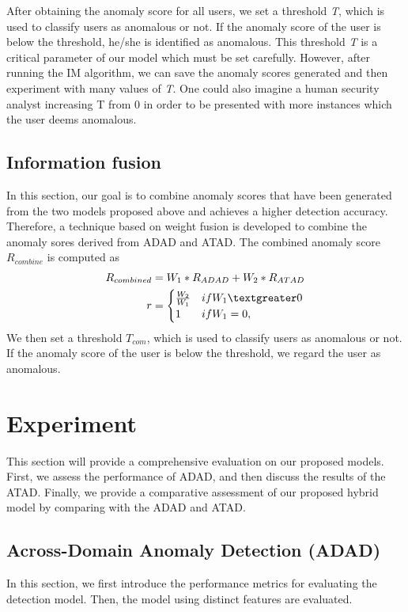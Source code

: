 \documentclass[conference]{IEEEtran}
\begin{document}
After obtaining the anomaly score for all users, 
we set a threshold \emph{T}, which is used to classify users as anomalous or not. If the anomaly score of the user is below the threshold, he/she is identified as anomalous. This threshold \emph{T} is a critical parameter of our model which must be set carefully.
However, after running the IM algorithm, we can save the anomaly scores generated and then experiment with many values of \emph{T}. One could also imagine a human security analyst increasing T from 0 in order to be presented with more instances which the user deems anomalous.
\subsection{Information fusion}
In this section, our goal is to combine anomaly scores that have been generated from the two models proposed above and achieves a higher detection accuracy.
Therefore, a technique based on weight fusion is developed to combine the anomaly sores derived  from ADAD and ATAD. The combined anomaly score \emph{$R_{combine}$} is computed as
\begin{align}
R_{combined}&= W_1*R_{ADAD}+W_2*R_{ATAD}\\
r&=\begin{cases}
\frac{W_2}{W_1}
&\mbox{if } W_1 \textgreater 0\\
1
&\mbox{if } W_1 = 0,\\
\end{cases}
\end{align}
We then set a threshold \emph{$T_{com}$}, which is used to classify users as anomalous or not. If the anomaly score of the user is below the threshold, we regard the user as anomalous.

\section{Experiment}

This section will provide a comprehensive evaluation on our proposed models. First, we assess the performance of ADAD, and then discuss the results of the ATAD. Finally, we 
provide a comparative assessment of our proposed hybrid model by comparing with the ADAD and ATAD.
\subsection{Across-Domain Anomaly Detection (ADAD)}\label{AA}
In this section, we first introduce the performance metrics for evaluating the detection model. 
Then, the model using distinct features are evaluated.
\end{document}
